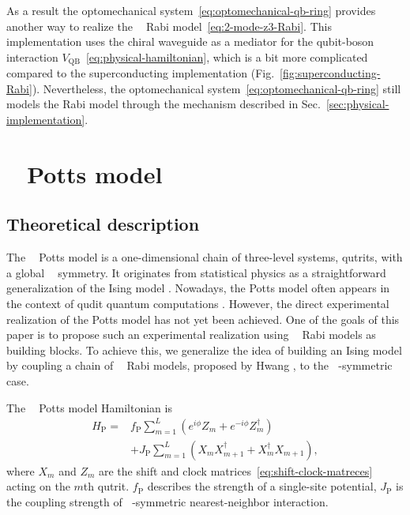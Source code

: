 \documentclass[reprint, aps, prx, amsmath, amssymb, longbibliography, superscriptaddress]{revtex4-2}
\DeclareMathOperator{\Zthree}{\mathbb{Z}_3}
\DeclareMathOperator{\Ztwo}{\mathbb{Z}_2}
\begin{document}
As a result the optomechanical system~\eqref{eq:optomechanical-qb-ring} provides another way to realize the $\Zthree$ Rabi model~\eqref{eq:2-mode-z3-Rabi}. This implementation uses the chiral waveguide as a mediator for the qubit-boson interaction $V_{\text{QB}}$~\eqref{eq:physical-hamiltonian}, which is a bit more complicated compared to the superconducting implementation (Fig.~\ref{fig:superconducting-Rabi}). Nevertheless, the optomechanical system~\eqref{eq:optomechanical-qb-ring} still models the Rabi model through the mechanism described in Sec.~\ref{sec:physical-implementation}.



\section{\texorpdfstring{$\Zthree$}{Z3} Potts model}
\label{sec:potts-model}

\subsection{Theoretical description}
\label{sec:theoretical-potts}


The $\Zthree$ Potts model \cite{wu_potts_1982} is a one-dimensional chain of three-level systems, qutrits, with a global $\Zthree$ symmetry. It  originates from statistical physics as a straightforward generalization of the Ising model  \cite{wu_potts_1982,baxter_critical_1982}. Nowadays, the Potts model often appears in the context of qudit quantum computations \cite{aharonov_polynomial_2007,okada_efficient_2019}. However, the direct experimental realization of the Potts model has not yet been achieved. One of the goals of this paper is to propose such an experimental realization using $\Zthree$ Rabi models as building blocks. To achieve this, we generalize the idea of building an Ising model by coupling a chain of $\Ztwo$ Rabi models, proposed by Hwang \cite{hwang_largescale_2013}, to the $\Zthree$-symmetric case.

The $\Zthree$ Potts model Hamiltonian is
\begin{equation}
\begin{aligned}
\label{eq:potts-hamiltonian}
H_{\text{P}} =& f_{\text{P}} \sum\limits_{m=1}^L \left(e^{i\phi}Z_m + e^{-i\phi}Z_m^{\dagger}\right) \\
  &+  J_{\text{P}} \sum\limits_{m=1}^L \left( X_m X_{m+1}^{\dagger} + X_m^{\dagger} X_{m+1}\right),
\end{aligned}
\end{equation}
where $X_m$ and $Z_m$ are the shift and clock matrices~\eqref{eq:shift-clock-matreces} acting on the $m$th qutrit. $f _\text{P}$ describes the strength of a single-site potential, $J_{\text{P}}$ is the coupling strength of $\Zthree$-symmetric nearest-neighbor interaction.
\end{document}
